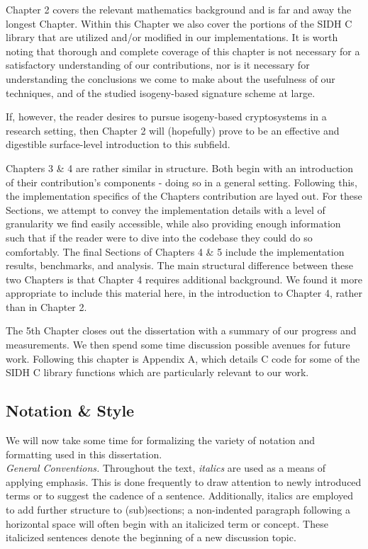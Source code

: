 Chapter 2 covers the relevant mathematics background and is far and away the longest Chapter. Within this Chapter we also cover the portions of the SIDH C library that are utilized and/or modified in our implementations. It is worth noting that thorough and complete coverage of this chapter is not necessary for a satisfactory understanding of our contributions, nor is it necessary for understanding the conclusions we come to make about the usefulness of our techniques, and of the studied isogeny-based signature scheme at large.

If, however, the reader desires to pursue isogeny-based cryptosystems in a research setting, then Chapter 2 will (hopefully) prove to be an effective and digestible surface-level introduction to this subfield.  

Chapters 3 \& 4 are rather similar in structure. Both begin with an introduction of their contribution's components - doing so in a general setting. Following this, the implementation specifics of the Chapters contribution are layed out. For these Sections, we attempt to convey the implementation details with a level of granularity we find easily accessible, while also providing enough information such that if the reader were to dive into the codebase they could do so comfortably. The final Sections of Chapters 4 \& 5 include the implementation results, benchmarks, and analysis. The main structural difference between these two Chapters is that Chapter 4 requires additional background. We found it more appropriate to include this material here, in the introduction to Chapter 4, rather than in Chapter 2.

The 5th Chapter closes out the dissertation with a summary of our progress and measurements. We then spend some time discussion possible avenues for future work. Following this chapter is Appendix A, which details C code for some of the SIDH C library functions which are particularly relevant to our work. 

\subsection{Notation \& Style}

We will now take some time for formalizing the variety of notation and formatting  used in this dissertation.\\

\noindent
\textit{General Conventions.} Throughout the text, \textit{italics} are used as a means of applying emphasis. This is done frequently to draw attention to newly introduced terms or to suggest the cadence of a sentence. Additionally, italics are employed to add further structure to (sub)sections; a non-indented paragraph following a horizontal space will often begin with an italicized term or concept. These italicized sentences denote the beginning of a new discussion topic.\\

